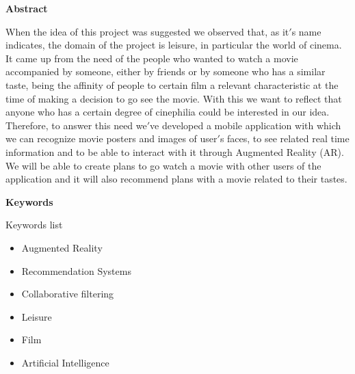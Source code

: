 
\newpage

\thispagestyle{empty}

\begin{center}

{\bf \Huge Abstract}

  \end{center}
\vspace{1cm}

When the idea of this project was suggested we observed that, as it$'$s name indicates, the
domain of the project is leisure, in particular the world of cinema. It came up from the need of 
the people who wanted to watch a movie accompanied by someone, either by friends or by someone who has
a similar taste, being the affinity of people to certain film a relevant characteristic at the time of making
a decision to go see the movie. With this we want to reflect that anyone who has a certain degree of cinephilia could be interested
in our idea. Therefore, to answer this need we$'$ve developed a mobile application with which we can recognize movie
posters and images of user$'$s faces, to see related real time information and to be able to interact with it through 
Augmented Reality (AR). We will be able to create plans to go watch a movie with other users of the application and it 
will also recommend plans with a movie related to their tastes.

\vspace{1cm}

\begin{center}

  {\bf \Large Keywords}
  
     \end{center}
  
     \vspace{0.5cm}
     
     Keywords list
     \begin{itemize}  
      \item Augmented Reality
      \item Recommendation Systems
      \item Collaborative filtering
      \item Leisure
      \item Film
      \item Artificial Intelligence
    \end{itemize}
   


